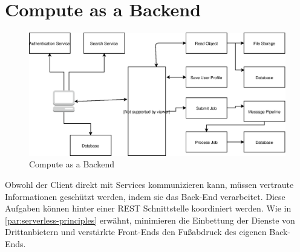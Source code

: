 \documentclass[
12pt,
english,
ngerman,
headsepline,
twoside,
openright,
numbers=noenddot,version=first
]{scrreprt}
\begin{document}
\section{Compute as a Backend}
\begin{figure}[H]
	\centering
		\includegraphics[scale=0.60]{./pics/compute-as-a-backend.eps}
	\caption{Compute as a Backend}
	\label{pic:compute-backend}
\end{figure}
Obwohl der Client direkt mit Services kommunizieren kann, müssen vertraute Informationen geschützt werden, indem sie das Back-End verarbeitet\cite{serverlessArchAWS}. Diese Aufgaben können hinter einer \acrshort{REST} Schnittstelle koordiniert werden. Wie in  \autoref{par:serverless-principles} erwähnt, minimieren die Einbettung der Dienste von Drittanbietern und verstärkte Front-Ends den Fußabdruck des eigenen Back-Ends.
\end{document}
